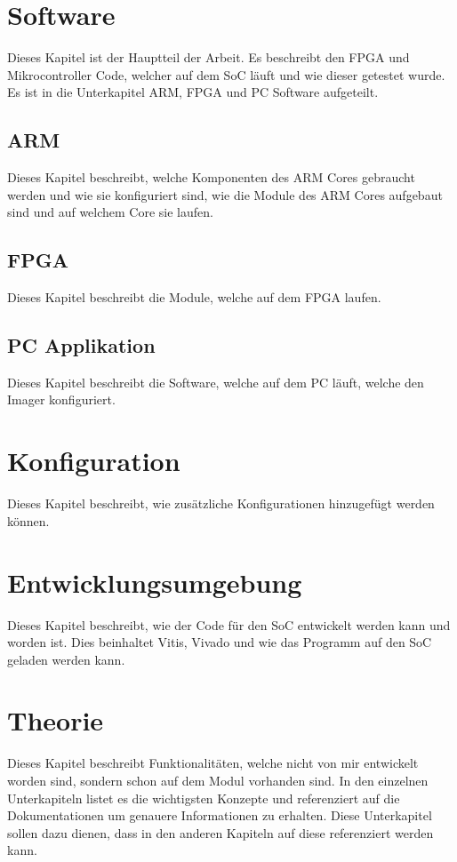 \documentclass{article}
\begin{document}
\section{Software}
Dieses Kapitel ist der Hauptteil der Arbeit. Es beschreibt den FPGA und Mikrocontroller Code, welcher auf dem SoC läuft und wie dieser getestet wurde. Es ist in die Unterkapitel ARM, FPGA und PC Software aufgeteilt.
\subsection{ARM}
Dieses Kapitel beschreibt, welche Komponenten des ARM Cores gebraucht werden und wie sie konfiguriert sind, wie die Module des ARM Cores aufgebaut sind und auf welchem Core sie laufen.
\subsection{FPGA}
Dieses Kapitel beschreibt die Module, welche auf dem FPGA laufen.
\subsection{PC Applikation}
Dieses Kapitel beschreibt die Software, welche auf dem PC läuft, welche den Imager konfiguriert.


\section{Konfiguration}
Dieses Kapitel beschreibt, wie zusätzliche Konfigurationen hinzugefügt werden können.

\section{Entwicklungsumgebung}
Dieses Kapitel beschreibt, wie der Code für den SoC entwickelt werden kann und worden ist. Dies beinhaltet Vitis, Vivado und wie das Programm auf den SoC geladen werden kann.

\section{Theorie}
Dieses Kapitel beschreibt Funktionalitäten, welche nicht von mir entwickelt worden sind, sondern schon auf dem Modul vorhanden sind. In den einzelnen Unterkapiteln listet es die wichtigsten Konzepte und referenziert auf die Dokumentationen um genauere Informationen zu erhalten. Diese Unterkapitel sollen dazu dienen, dass in den anderen Kapiteln auf diese referenziert werden kann.
\end{document}

